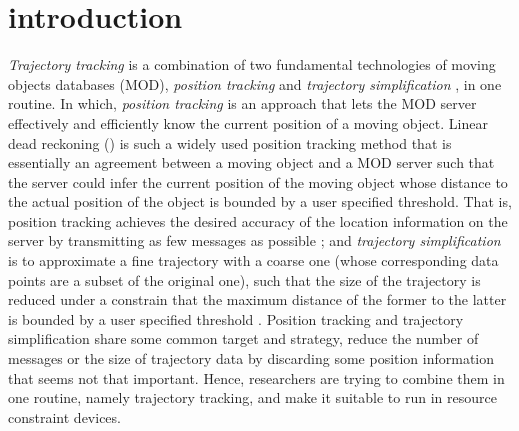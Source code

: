 

\section{introduction}
\label{sec-intro}


\textit{Trajectory tracking} \cite{Lange:Tracking} is a combination of two fundamental technologies of moving objects databases (MOD), \textit{position tracking} \cite{Wolfson:PositionTracking,Leonhardi:Comparison} and \textit{trajectory simplification} \cite{Lin:Cised,Zhang:Evaluation}, in one routine. In which, \textit{position tracking} is an approach that lets the MOD server effectively and efficiently know the current position of a moving object. Linear dead reckoning (\ldr) \cite{Wolfson:PositionTracking} is such a widely used position tracking method that is essentially an agreement between a moving object and a MOD server such that the server could infer the current position of the moving object whose distance to the actual position of the object is bounded by a user specified threshold. That is, position tracking achieves the desired accuracy of the location information on the server by transmitting as few messages as possible \cite{Leonhardi:Comparison};
%
and \textit{trajectory simplification} is to approximate a fine trajectory with a coarse one (whose corresponding data points are a subset of the original one), such that the size of the trajectory is reduced under a constrain that the maximum distance of the former to the latter is bounded by a user specified threshold \cite{Lin:Cised,Zhang:Evaluation}. 
%
Position tracking and trajectory simplification share some common target and strategy, \ie reduce the number of messages or the size of trajectory data by discarding some position information that seems not that important. Hence, researchers are trying to combine them in one routine, namely trajectory tracking, and make it suitable to run in resource constraint devices.

